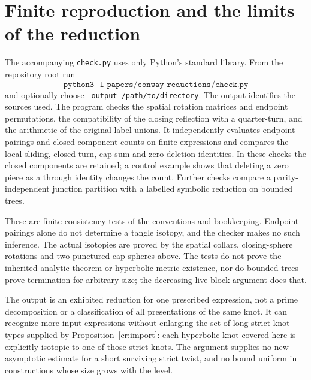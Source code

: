 \section{Finite reproduction and the limits of the reduction}\label{cr:reproduction}

The accompanying \texttt{check.py} uses only Python's standard library. From the repository root run
\[
 \texttt{python3 -I papers/conway-reductions/check.py}
\]
and optionally choose \texttt{--output /path/to/directory}.
The output identifies the sources used. The program checks the spatial rotation matrices and endpoint permutations, the compatibility of the closing reflection with a quarter-turn, and the arithmetic of the original label unions. It independently evaluates endpoint pairings and closed-component counts on finite expressions and compares the local sliding, closed-turn, cap-sum and zero-deletion identities. In these checks the closed components are retained; a control example shows that deleting a zero piece as a through identity changes the count. Further checks compare a parity-independent junction partition with a labelled symbolic reduction on bounded trees.

These are finite consistency tests of the conventions and bookkeeping. Endpoint pairings alone do not determine a tangle isotopy, and the checker makes no such inference. The actual isotopies are proved by the spatial collars, closing-sphere rotations and two-punctured cap spheres above. The tests do not prove the inherited analytic theorem or hyperbolic metric existence, nor do bounded trees prove termination for arbitrary size; the decreasing live-block argument does that.

The output is an exhibited reduction for one prescribed expression, not a prime decomposition or a classification of all presentations of the same knot. It can recognize more input expressions without enlarging the set of long strict knot types supplied by Proposition~\ref{cr:import}: each hyperbolic knot covered here is explicitly isotopic to one of those strict knots. The argument supplies no new asymptotic estimate for a short surviving strict twist, and no bound uniform in constructions whose size grows with the level.
